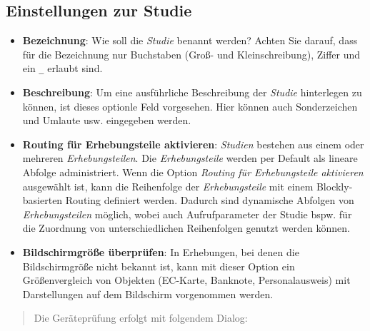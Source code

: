 \documentclass[
  letterpaper,
  DIV=11]{scrreprt}
\begin{document}
\begin{tcolorbox}[enhanced jigsaw, colbacktitle=quarto-callout-tip-color!10!white, coltitle=black, colframe=quarto-callout-tip-color-frame, leftrule=.75mm, breakable, opacitybacktitle=0.6, toprule=.15mm, title=\textcolor{quarto-callout-tip-color}{\faLightbulb}\hspace{0.5em}{Eingebettete Programmhilfe}, colback=white, titlerule=0mm, arc=.35mm, bottomtitle=1mm, toptitle=1mm, rightrule=.15mm, bottomrule=.15mm, left=2mm, opacityback=0]

\hypertarget{einstellungen-zur-studie-1}{%
\subsection{Einstellungen zur Studie}\label{einstellungen-zur-studie-1}}

\begin{itemize}
\item
  \textbf{Bezeichnung}: Wie soll die \emph{Studie} benannt werden?
  Achten Sie darauf, dass für die Bezeichnung nur Buchstaben (Groß- und
  Kleinschreibung), Ziffer und ein \texttt{\_} erlaubt sind.
\item
  \textbf{Beschreibung}: Um eine ausführliche Beschreibung der
  \emph{Studie} hinterlegen zu können, ist dieses optionle Feld
  vorgesehen. Hier können auch Sonderzeichen und Umlaute usw. eingegeben
  werden.
\item
  \textbf{Routing für Erhebungsteile aktivieren}: \emph{Studien}
  bestehen aus einem oder mehreren \emph{Erhebungsteilen}. Die
  \emph{Erhebungsteile} werden per Default als lineare Abfolge
  administriert. Wenn die Option \emph{Routing für Erhebungsteile
  aktivieren} ausgewählt ist, kann die Reihenfolge der
  \emph{Erhebungsteile} mit einem Blockly-basierten Routing definiert
  werden. Dadurch sind dynamische Abfolgen von \emph{Erhebungsteilen}
  möglich, wobei auch Aufrufparameter der Studie bspw. für die Zuordnung
  von unterschiedlichen Reihenfolgen genutzt werden können.
\item
  \textbf{Bildschirmgröße überprüfen}: In Erhebungen, bei denen die
  Bildschirmgröße nicht bekannt ist, kann mit dieser Option ein
  Größenvergleich von Objekten (EC-Karte, Banknote, Personalausweis) mit
  Darstellungen auf dem Bildschirm vorgenommen werden.
\end{itemize}

\begin{quote}
Die Geräteprüfung erfolgt mit folgendem Dialog:
\end{quote}


\end{tcolorbox}
\end{document}
